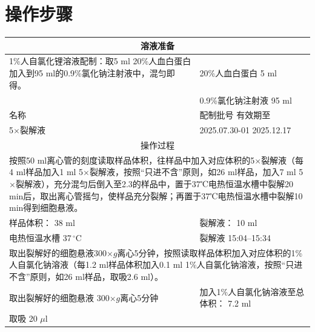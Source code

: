 \documentclass[UTF8,10pt,a4paper,fontset=fandol]{ctexart}
\newcommand{\fieldvalue}[1]{#1}
\newcommand{\handwritten}[1]{#1}
\begin{document}
\section{操作步骤}

\begin{center}
\begin{tabular}{|p{7.4cm}|p{6.6cm}|}
\hline
\multicolumn{2}{|c|}{溶液准备} \\ \hline
1\%人自氯化锂溶液配制：取5 ml 20\%人血白蛋白加入到95 ml的0.9\%氯化钠注射液中，混匀即得。 &
20\%人血白蛋白
\fieldvalue{\handwritten{5}} ml \\[-1mm]
& 0.9\%氯化钠注射液
\fieldvalue{\handwritten{95}} ml \\ \hline
名称 & 配制批号 \hspace{3cm} 有效期至 \\ \hline
5$\times$裂解液 &
\fieldvalue{\handwritten{2025.07.30-01}}
\hspace{1.0cm}
\fieldvalue{\handwritten{2025.12.17}} \\ \hline
\multicolumn{2}{|c|}{操作过程} \\ \hline
\multicolumn{2}{|p{7.4cm}|}{按照50 ml离心管的刻度读取样品体积，往样品中加入对应体积的5$\times$裂解液（每4 ml样品加入1 ml 5$\times$裂解液，按照“只进不含”原则，如26 ml样品，加入7 ml 5$\times$裂解液），充分混匀后倒入至2.3的样品中，置于37℃电热恒温水槽中裂解20 min后，取出离心管摇匀，使样品充分裂解；再置于37℃电热恒温水槽中裂解10 min得到细胞悬液。} \\ \hline
样品体积：
\fieldvalue{\handwritten{38}} ml &
裂解液：
\fieldvalue{\handwritten{10}} ml \\ \hline
电热恒温水槽
\fieldvalue{\handwritten{37}}\,${}^{\circ}$C &
裂解液
\fieldvalue{\handwritten{15:04--15:34}} \\ \hline
\multicolumn{2}{|p{14.0cm}|}{取出裂解好的细胞悬液300$\times g$离心5分钟，按照读取样品体积加入对应体积的1\%人自氯化钠溶液（每1.2 ml样品体积加入0.1 ml 1\%人自氯化钠溶液，按照“只进不含”原则，如26 ml样品，取吸2.6 ml）。} \\ \hline
取出裂解好的细胞悬液
\fieldvalue{\handwritten{300}}$\times g$离心5分钟 &
加入1\%人自氯化钠溶液至总体积：
\fieldvalue{\handwritten{7.2}} ml \\ \hline
取吸
\fieldvalue{\handwritten{20}} $\mu$l &
\end{tabular}
\end{center}
\end{document}
